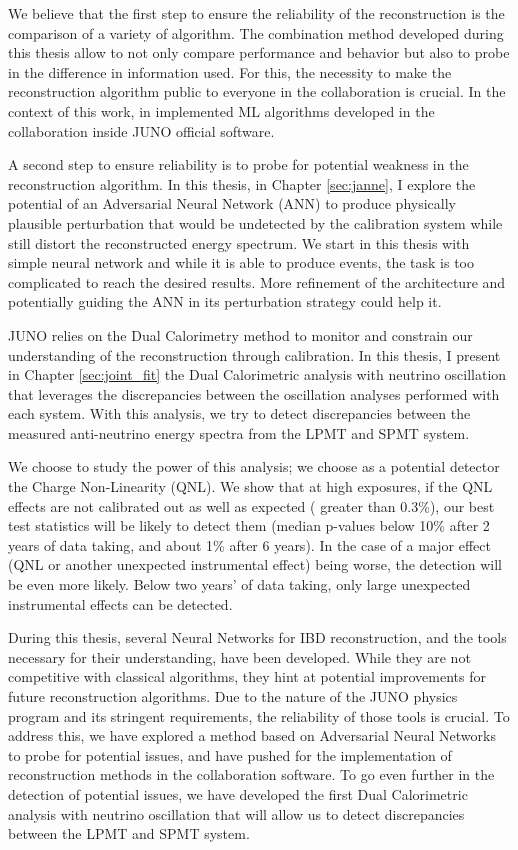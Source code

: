 \documentclass[../main.tex]{subfiles}
\begin{document}
We believe that the first step to ensure the reliability of the reconstruction is the comparison of a variety of algorithm. The combination method developed during this thesis allow to not only compare performance and behavior but also to probe in the difference in information used. For this, the necessity to make the reconstruction algorithm public to everyone in the collaboration is crucial. In the context of this work, in implemented ML algorithms developed in the collaboration inside JUNO official software.

A second step to ensure reliability is to probe for potential weakness in the reconstruction algorithm. In this thesis, in Chapter \ref{sec:janne}, I explore the potential of an Adversarial Neural Network (ANN) to produce physically plausible perturbation that would be undetected by the calibration system while still distort the reconstructed energy spectrum. We start in this thesis with simple neural network and while it is able to produce events, the task is too complicated to reach the desired results. More refinement of the architecture and potentially guiding the ANN in its perturbation strategy could help it.

\hfill

JUNO relies on the Dual Calorimetry method to monitor and constrain our understanding of the reconstruction through calibration. In this thesis, I present in Chapter \ref{sec:joint_fit} the Dual Calorimetric analysis with neutrino oscillation that leverages the discrepancies between the oscillation analyses performed with each system. With this analysis, we try to detect discrepancies between the measured anti-neutrino energy spectra from the LPMT and SPMT system.

We choose to study the power of this analysis; we choose as a potential detector the Charge Non-Linearity (QNL). We show that at high exposures, if the QNL effects are not calibrated out as well as expected ( greater than $0.3\%$), our best test statistics will be likely to detect them (median p-values below 10\% after 2 years of data taking, and about 1\% after 6 years). In the case of a major effect (QNL or another unexpected instrumental effect) being worse, the detection will be even more likely. Below two years' of data taking, only large unexpected instrumental effects can be detected.

\hfill

During this thesis, several Neural Networks for IBD reconstruction, and the tools necessary for their understanding, have been developed. While they are not competitive with classical algorithms, they hint at potential improvements for future reconstruction algorithms. Due to the nature of the JUNO physics program and its stringent requirements, the reliability of those tools is crucial. To address this, we have explored a method based on Adversarial Neural Networks to probe for potential issues, and have pushed for the implementation of reconstruction methods in the collaboration software. To go even further in the detection of potential issues, we have developed the first Dual Calorimetric analysis with neutrino oscillation that will allow us to detect discrepancies between the LPMT and SPMT system.
\end{document}
